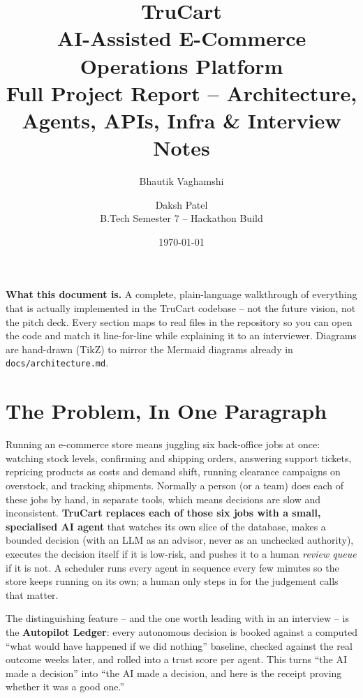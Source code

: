 \documentclass[11pt,a4paper]{article}
\title{
  \vspace{-1.5cm}
  {\Huge\bfseries\color{ink} TruCart}\\[6pt]
  {\Large AI-Assisted E-Commerce Operations Platform}\\[4pt]
  {\large\color{gray} Full Project Report -- Architecture, Agents, APIs, Infra \& Interview Notes}
}
\author{Bhautik Vaghamshi \and Daksh Patel \\ \small B.Tech Semester 7 -- Hackathon Build}
\date{\small \today}
\begin{document}
\maketitle
\thispagestyle{empty}

\begin{keybox}
\textbf{What this document is.} A complete, plain-language walkthrough of everything that is
actually implemented in the TruCart codebase -- not the future vision, not the pitch deck.
Every section maps to real files in the repository so you can open the code and match it
line-for-line while explaining it to an interviewer. Diagrams are hand-drawn (TikZ) to mirror
the Mermaid diagrams already in \texttt{docs/architecture.md}.
\end{keybox}

\tableofcontents
\newpage

\section{The Problem, In One Paragraph}

Running an e-commerce store means juggling six back-office jobs at once: watching stock levels,
confirming and shipping orders, answering support tickets, repricing products as costs and
demand shift, running clearance campaigns on overstock, and tracking shipments. Normally a
person (or a team) does each of these jobs by hand, in separate tools, which means decisions
are slow and inconsistent. \textbf{TruCart replaces each of those six jobs with a small,
specialised AI agent} that watches its own slice of the database, makes a bounded decision
(with an LLM as an advisor, never as an unchecked authority), executes the decision itself if
it is low-risk, and pushes it to a human \emph{review queue} if it is not. A scheduler runs
every agent in sequence every few minutes so the store keeps running on its own; a human only
steps in for the judgement calls that matter.

The distinguishing feature -- and the one worth leading with in an interview -- is the
\textbf{Autopilot Ledger}: every autonomous decision is booked against a computed
``what would have happened if we did nothing'' baseline, checked against the real outcome
weeks later, and rolled into a trust score per agent. This turns ``the AI made a decision''
into ``the AI made a decision, and here is the receipt proving whether it was a good one.''
\end{document}
